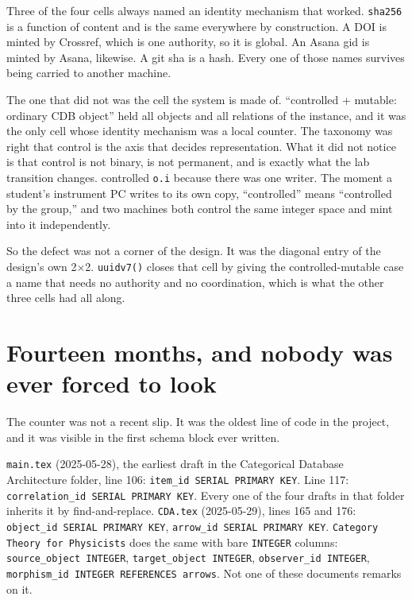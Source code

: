 Three of the four cells always named an identity mechanism that worked. \texttt{sha256} is a function of content and is the same everywhere by construction. A DOI is minted by Crossref, which is one authority, so it is global. An Asana gid is minted by Asana, likewise. A git sha is a hash. Every one of those names survives being carried to another machine.

The one that did not was the cell the system is made of. ``controlled + mutable: ordinary CDB object'' held all \labLineageObjects{} objects and all \labLineageRelations{} relations of the \labLineageName{} instance, and it was the only cell whose identity mechanism was a local counter. The taxonomy was right that control is the axis that decides representation. What it did not notice is that control is not binary, is not permanent, and is exactly what the lab transition changes. \labPI{} controlled \texttt{o.i} because there was one writer. The moment a student's instrument PC writes to its own copy, ``controlled'' means ``controlled by the group,'' and two machines both control the same integer space and mint into it independently.

So the defect was not a corner of the design. It was the diagonal entry of the design's own 2$\times$2. \texttt{uuidv7()} closes that cell by giving the controlled-mutable case a name that needs no authority and no coordination, which is what the other three cells had all along.

\section{Fourteen months, and nobody was ever forced to look}

The counter was not a recent slip. It was the oldest line of code in the project, and it was visible in the first schema block ever written.

\texttt{main.tex} (2025-05-28), the earliest draft in the Categorical Database Architecture folder, line 106: \texttt{item\_id SERIAL PRIMARY KEY}. Line 117: \texttt{correlation\_id SERIAL PRIMARY KEY}. Every one of the four drafts in that folder inherits it by find-and-replace. \texttt{CDA.tex} (2025-05-29), lines 165 and 176: \texttt{object\_id SERIAL PRIMARY KEY}, \texttt{arrow\_id SERIAL PRIMARY KEY}. \texttt{Category Theory for Physicists} does the same with bare \texttt{INTEGER} columns: \texttt{source\_object INTEGER}, \texttt{target\_object INTEGER}, \texttt{observer\_id INTEGER}, \texttt{morphism\_id INTEGER REFERENCES arrows}. Not one of these documents remarks on it.

